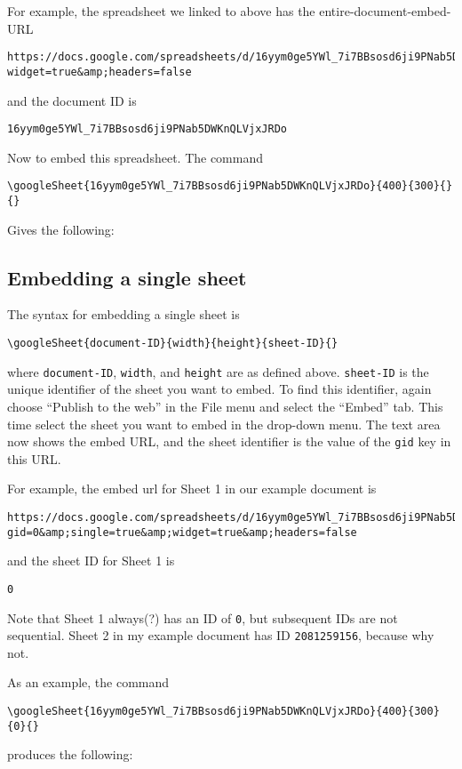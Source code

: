 \documentclass{ximera}
\begin{document}
For example, the spreadsheet we linked to above has the entire-document-embed-URL
\begin{verbatim}
https://docs.google.com/spreadsheets/d/16yym0ge5YWl_7i7BBsosd6ji9PNab5DWKnQLVjxJRDo/pubhtml?widget=true&amp;headers=false
\end{verbatim}
and the document ID is
\begin{verbatim}
16yym0ge5YWl_7i7BBsosd6ji9PNab5DWKnQLVjxJRDo
\end{verbatim}

Now to embed this spreadsheet. The command
\begin{verbatim}
\googleSheet{16yym0ge5YWl_7i7BBsosd6ji9PNab5DWKnQLVjxJRDo}{400}{300}{}{}
\end{verbatim}
Gives the following:


\subsection{Embedding a single sheet}

The syntax for embedding a single sheet is
\begin{verbatim}
\googleSheet{document-ID}{width}{height}{sheet-ID}{}
\end{verbatim}
where \texttt{document-ID}, \texttt{width}, and \texttt{height} are as defined above. \texttt{sheet-ID} is the unique identifier of the sheet you want to embed. To find this identifier, again choose ``Publish to the web'' in the File menu and select the ``Embed'' tab. This time select the sheet you want to embed in the drop-down menu. The text area now shows the embed URL, and the sheet identifier is the value of the \texttt{gid} key in this URL.

For example, the embed url for Sheet 1 in our example document is 
\begin{verbatim}
https://docs.google.com/spreadsheets/d/16yym0ge5YWl_7i7BBsosd6ji9PNab5DWKnQLVjxJRDo/pubhtml?gid=0&amp;single=true&amp;widget=true&amp;headers=false
\end{verbatim}
and the sheet ID for Sheet 1 is
\begin{verbatim}
0
\end{verbatim}
Note that Sheet 1 always(?) has an ID of \texttt{0}, but subsequent IDs are not sequential. Sheet 2 in my example document has ID \texttt{2081259156}, because why not.

As an example, the command
\begin{verbatim}
\googleSheet{16yym0ge5YWl_7i7BBsosd6ji9PNab5DWKnQLVjxJRDo}{400}{300}{0}{}
\end{verbatim}
produces the following:
\end{document}
